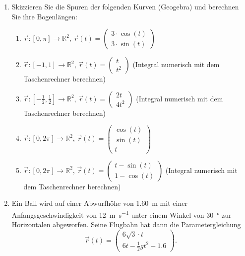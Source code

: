 \begin{ueb}
    {}{}
    \begin{enumerate}
        \item Skizzieren Sie die Spuren der folgenden Kurven (Geogebra) und berechnen Sie ihre Bogenlängen:

              \begin{enumerate}
                  \item \(\vec{r}: [0,\pi] \rightarrow \mathbb{R}^2\), \quad \(\vec{r}(t) = \begin{pmatrix} 3 \cdot \cos(t) \\ 3 \cdot \sin(t) \end{pmatrix}\)
                  \item \(\vec{r}: [-1,1] \rightarrow \mathbb{R}^2\), \quad \(\vec{r}(t) = \begin{pmatrix} t \\ t^2 \end{pmatrix}\) (Integral numerisch mit dem Taschenrechner berechnen)
                  \item \(\vec{r}: \left[-\frac{1}{2}, \frac{1}{2}\right] \rightarrow \mathbb{R}^2\), \quad \(\vec{r}(t) = \begin{pmatrix} 2t \\ 4t^2 \end{pmatrix}\) (Integral numerisch mit dem Taschenrechner berechnen)
                  \item \(\vec{r}: [0, 2\pi] \rightarrow \mathbb{R}^2\), \quad \(\vec{r}(t) = \begin{pmatrix} \cos(t) \\ \sin(t) \\ t \end{pmatrix}\)
                  \item \(\vec{r}: [0, 2\pi] \rightarrow \mathbb{R}^2\), \quad \(\vec{r}(t) = \begin{pmatrix} t- \sin(t) \\ 1-\cos(t) \end{pmatrix}\) (Integral numerisch mit dem Taschenrechner berechnen)
              \end{enumerate}

        \item Ein Ball wird auf einer Abwurfhöhe von \SI{1.60}{\meter} mit einer Anfangsgeschwindigkeit von \SI{12}{\meter\per\second} unter einem Winkel von \SI{30}{\degree} zur Horizontalen abgeworfen. Seine Flugbahn hat dann die Parametergleichung
              \[
                  \vec{r}(t) = \begin{pmatrix}
                      6\sqrt{3}\cdot t \\
                      6t - \frac{1}{2} g t^2 + 1.6
                  \end{pmatrix}.
              \]


\end{enumerate}
\end{ueb}
